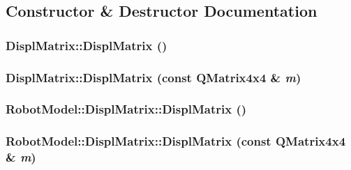 \subsection{Constructor \& Destructor Documentation}
\hypertarget{class_robot_model_1_1_displ_matrix_a97463ac04605597575600274a23109de}{
\subsubsection[{DisplMatrix}]{\setlength{\rightskip}{0pt plus 5cm}DisplMatrix::DisplMatrix ()}}
\label{class_robot_model_1_1_displ_matrix_a97463ac04605597575600274a23109de}
\hypertarget{class_robot_model_1_1_displ_matrix_a6934f8d81e8e5b9c8dbcc1d6fd68c560}{
\subsubsection[{DisplMatrix}]{\setlength{\rightskip}{0pt plus 5cm}DisplMatrix::DisplMatrix (const QMatrix4x4 \& {\em m})}}
\label{class_robot_model_1_1_displ_matrix_a6934f8d81e8e5b9c8dbcc1d6fd68c560}
\hypertarget{class_robot_model_1_1_displ_matrix_a4404a1a69859c9725090684813ea8c28}{
\subsubsection[{DisplMatrix}]{\setlength{\rightskip}{0pt plus 5cm}RobotModel::DisplMatrix::DisplMatrix ()}}
\label{class_robot_model_1_1_displ_matrix_a4404a1a69859c9725090684813ea8c28}
\hypertarget{class_robot_model_1_1_displ_matrix_a27c4e90d76c000fdd29632a1a731eeaf}{
\subsubsection[{DisplMatrix}]{\setlength{\rightskip}{0pt plus 5cm}RobotModel::DisplMatrix::DisplMatrix (const QMatrix4x4 \& {\em m})}}
\label{class_robot_model_1_1_displ_matrix_a27c4e90d76c000fdd29632a1a731eeaf}


